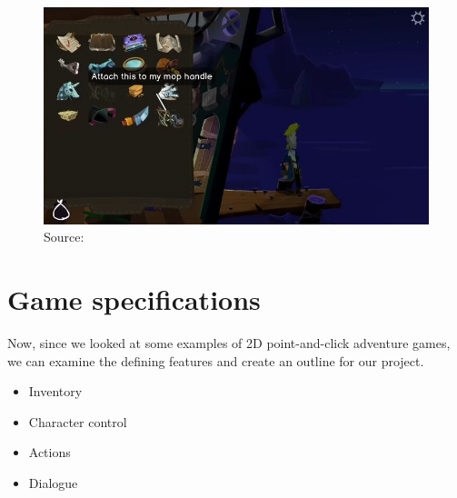 \begin{figure}[H]
\centering
\includegraphics[width=.7\linewidth]{img/RtMI2.png}
\caption{Source:  \cite{}}
\label{fig:RtMI2}
\end{figure}

\section{Game specifications}

Now, since we looked at some examples of 2D point-and-click adventure games, we can examine the defining features and create an outline for our project. 


\begin{itemize}
\item Inventory
\item Character control
\item Actions
\item Dialogue
\end{itemize}